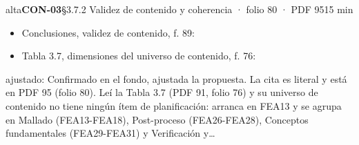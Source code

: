 \begin{ficha}{alta}{\casilla\textbf{CON-03}\quad{}\quad §3.7.2 Validez de contenido y coherencia · folio 80 · PDF 95\hfill 15 min}
\begin{itemize}[leftmargin=1.2em,itemsep=1pt,topsep=1pt]
\item {\small Conclusiones, validez de contenido, f. 89: }
\item {\small Tabla 3.7, dimensiones del universo de contenido, f. 76: }
\end{itemize}
{\footnotesize\color{gris}ajustado: Confirmado en el fondo, ajustada la propuesta. La cita es literal y está en PDF 95 (folio 80). Leí la Tabla 3.7 (PDF 91, folio 76) y su universo de contenido no tiene ningún ítem de planificación: arranca en FEA13 y se agrupa en Mallado (FEA13-FEA18), Post-proceso (FEA26-FEA28), Conceptos fundamentales (FEA29-FEA31) y Verificación y…\par}
\end{ficha}
{\small{}\par}

